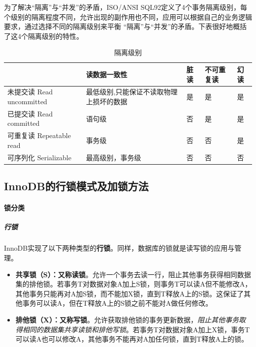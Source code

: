 \documentclass[UTF8,a4paper,12pt]{ctexbook}
\begin{document}
				为了解决“隔离”与“并发”的矛盾，ISO/ANSI SQL92定义了4个事务隔离级别，每个级别的隔离程度不同，允许出现的副作用也不同，应用可以根据自己的业务逻辑要求，通过选择不同的隔离级别来平衡 “隔离”与“并发”的矛盾。下表很好地概括了这4个隔离级别的特性。
				\begin{table}[H]
					\centering
					\caption{隔离级别}
					\begin{tabular}{p{5cm}<{\centering} | p{5cm}<{\centering} | p{1cm}<{\centering} |p{2.5cm}<{\centering} |p{1cm}<{\centering}}
						\toprule
						\diagbox[width=5cm,trim=l]{隔离级别}{允许的并发副作用}	& 读数据一致性 & 脏读 & 不可重复读 & 幻读\\
						\midrule
						未提交读 Read uncommitted &  最低级别,只能保证不读取物理上损坏的数据 & 是 & 是 & 是\\
						\hline
						已提交读 Read committed &  语句级 & 否 & 是 & 是 \\
						\hline
						可重复读 Repeatable read &  事务级 & 否 & 否 & 是 \\
						\hline
						可序列化 Serializable &  最高级别，事务级 & 否 & 否 & 否\\
						\bottomrule
					\end{tabular}
				\end{table}
		
		\subsection{InnoDB的行锁模式及加锁方法}
			\paragraph{锁分类}
			
				\subparagraph{行锁}
					InnoDB实现了以下两种类型的\textbf{行锁}。同样，数据库的锁就是读写锁的应用与管理。
		
					\begin{itemize}[itemindent = 1em]
						\item \textbf{共享锁（S）：又称读锁}。允许一个事务去读一行，阻止其他事务获得相同数据集的排他锁。若事务T对数据对象A加上S锁，则事务T可以读A但不能修改A，其他事务只能再对A加S锁，而不能加X锁，直到T释放A上的S锁。这保证了其他事务可以读A，但在T释放A上的S锁之前不能对A做任何修改。
						\item \textbf{排他锁（X）：又称写锁}。允许获取排他锁的事务更新数据，\textit{阻止其他事务取得相同的数据集共享读锁和排他写锁}。若事务T对数据对象A加上X锁，事务T可以读A也可以修改A，其他事务不能再对A加任何锁，直到T释放A上的锁。
					\end{itemize}
			
\end{document}
